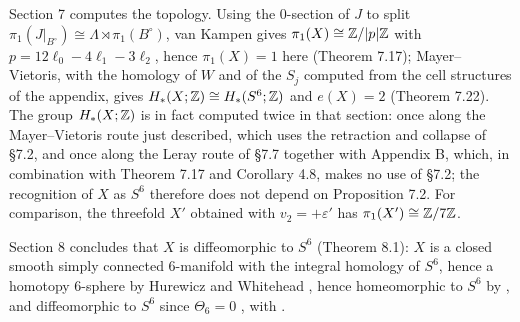 Section 7 computes the topology. Using the $0$-section of $J$ to split $\pi_1(J|_{B^\circ}) \cong \Lambda \rtimes \pi_1(B^\circ)$, van Kampen gives $\pi_1(X) \cong \mathbb{Z}/|p|\mathbb{Z}$ with $p = 12\ell_0 - 4\ell_1 - 3\ell_2$, hence $\pi_1(X) = 1$ here (Theorem 7.17); Mayer--Vietoris, with the homology of $W$ and of the $S_j$ computed from the cell structures of the appendix, gives $H_*(X;\mathbb{Z}) \cong H_*(S^6;\mathbb{Z})$ and $e(X) = 2$ (Theorem 7.22). The group $H_*(X;\mathbb{Z})$ is in fact computed twice in that section: once along the Mayer--Vietoris route just described, which uses the retraction and collapse of \S7.2, and once along the Leray route of \S7.7 together with Appendix B, which, in combination with Theorem 7.17 and Corollary 4.8, makes no use of \S7.2; the recognition of $X$ as $S^6$ therefore does not depend on Proposition 7.2. For comparison, the threefold $X'$ obtained with $v_2 = +\varepsilon'$ has $\pi_1(X') \cong \mathbb{Z}/7\mathbb{Z}$.

Section 8 concludes that $X$ is diffeomorphic to $S^6$ (Theorem 8.1): $X$ is a closed smooth simply connected $6$-manifold with the integral homology of $S^6$, hence a homotopy $6$-sphere by Hurewicz and Whitehead \cite{Hat02}, hence homeomorphic to $S^6$ by \cite{Sma61}, and diffeomorphic to $S^6$ since $\Theta_6 = 0$ \cite{KM63}, with \cite{Mil65}.

